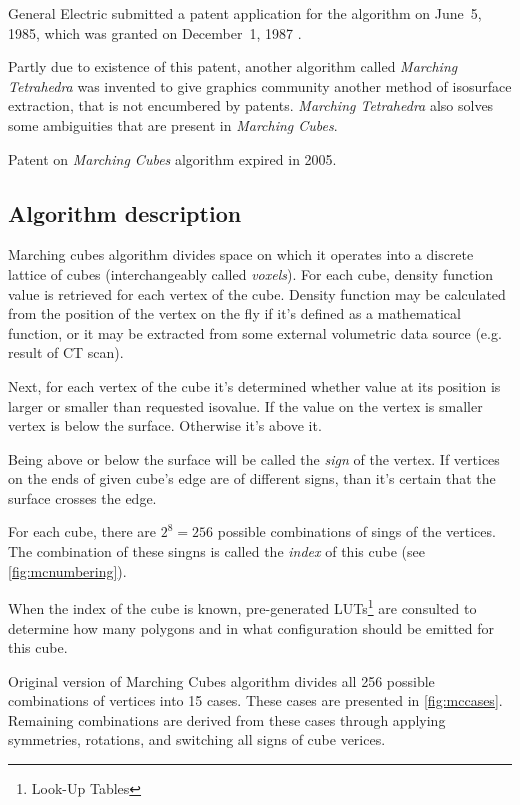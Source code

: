 General Electric submitted a patent application for the algorithm on
June~5, 1985, which was granted on December~1, 1987 \parencite{mcpatent}.

Partly due to existence of this patent, another algorithm called
\emph{Marching Tetrahedra} was invented to give graphics community another
method of isosurface extraction, that is not encumbered by patents.
\emph{Marching Tetrahedra} also solves some ambiguities that are present in
\emph{Marching Cubes}.

Patent on \emph{Marching Cubes} algorithm expired in 2005.

\subsection{Algorithm description \parencite{Lorensen:1987:MCH:37402.37422}}
\label{sec:mcdesc}

Marching cubes algorithm divides space on which it operates into a discrete
lattice of cubes (interchangeably called \emph{voxels}). For each cube, density
function value is retrieved for each vertex of the cube. Density function may be
calculated from the position of the vertex on the fly if it's defined as a
mathematical function, or it may be extracted from some external volumetric data
source (e.g. result of CT scan).

Next, for each vertex of the cube it's determined whether value at its position
is larger or smaller than requested isovalue. If the value on the vertex is
smaller vertex is below the surface. Otherwise it's above it.

Being above or below the surface will be called the \emph{sign} of the vertex.
If vertices on the ends of given cube's edge are of different signs, than it's
certain that the surface crosses the edge.

For each cube, there are $2^8=256$ possible combinations of sings of the
vertices.  The combination of these singns is called the
\emph{index} of this cube (see \autoref{fig:mcnumbering}).

When the index of the cube is known, pre-generated LUTs\footnote{Look-Up Tables}
are consulted to determine how many polygons and in what configuration should be
emitted for this cube.

Original version of Marching Cubes algorithm divides all 256 possible
combinations of vertices into 15 cases. These cases are presented in
\autoref{fig:mccases}. Remaining combinations are derived from these cases
through applying symmetries, rotations, and switching all signs of cube verices.

